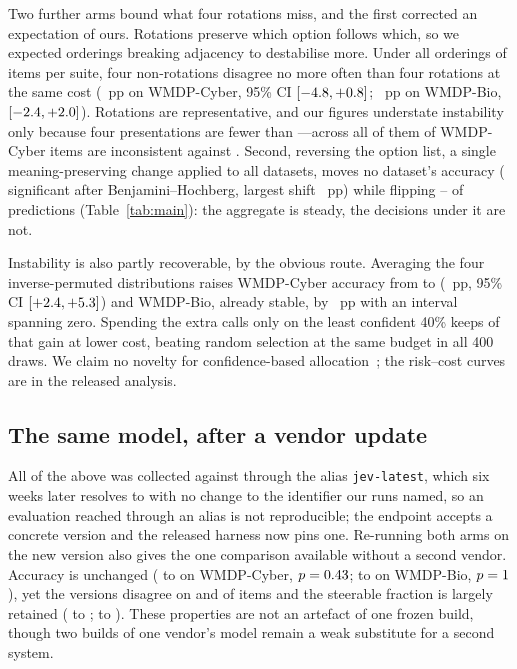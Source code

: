 \documentclass[conference]{IEEEtran}
\begin{document}
Two further arms bound what four rotations miss, and the first corrected an expectation of
ours. Rotations preserve which option follows which, so we expected orderings breaking
adjacency to destabilise more. Under all \statPermNOrderingsCyber{} orderings of
\statPermNItemsCyber{} items per suite, four non-rotations disagree no more often than
four rotations at the same cost (\statPermMatchedDiffCyber{}~pp on WMDP-Cyber, 95\% CI
$[-4.8, +0.8]{}$; \statPermMatchedDiffBio{}~pp on WMDP-Bio,
$[-2.4, +2.0]{}$). Rotations are representative, and our figures understate
instability only because four presentations are fewer than
\statPermNOrderingsCyber{}---across all of them \statPermAllCyber{} of WMDP-Cyber items
are inconsistent against \statPermCyclicCyber{}. Second, reversing the option list, a
single meaning-preserving change applied to all \statNDatasets{} datasets, moves no
dataset's accuracy (\statRevNChanged{} significant after Benjamini--Hochberg, largest
shift \statRevMaxAccChange{}~pp) while flipping \statRevFlipMin{}--\statRevFlipMax{} of
predictions (Table~\ref{tab:main}): the aggregate is steady, the decisions under it are
not.

Instability is also partly recoverable, by the obvious route. Averaging the four
inverse-permuted distributions raises WMDP-Cyber accuracy from \statSingleAccCyber{} to
\statEnsAccCyber{} (\statEnsGainCyber{}~pp, 95\% CI $[+2.4{},
+5.3{}]$) and WMDP-Bio, already \statConsistBio{} stable, by
\statEnsGainBio{}~pp with an interval spanning zero. Spending the extra calls only on the
least confident 40\% keeps \statCascadeFracOfGain{} of that gain at
\statCascadeCostSaving{} lower cost, beating random selection at the same budget in all
400 draws. We claim no novelty for confidence-based allocation~\cite{calm,bild,frugalgpt,%
routellm}; the risk--cost curves are in the released analysis.

\subsection{The same model, after a vendor update}
\label{sec:version}

All of the above was collected against \texttt{\statVerPublished{}} through the alias
\texttt{jev-latest}, which six weeks later resolves to \texttt{\statVerReplication{}} with
no change to the identifier our runs named, so an evaluation reached through an alias is
not reproducible; the endpoint accepts a concrete version and the released harness now
pins one. Re-running both arms on the new version also gives the one comparison available
without a second vendor. Accuracy is unchanged (\statVerAccOldCyber{} to
\statVerAccNewCyber{} on WMDP-Cyber, $p = 0.43{}$; \statVerAccOldBio{} to
\statVerAccNewBio{} on WMDP-Bio, $p = 1{}$), yet the versions disagree on
\statVerDisagreeCyber{} and \statVerDisagreeBio{} of items and the steerable fraction is
largely retained (\statVerSteerOldCyber{} to \statVerSteerNewCyber{};
\statVerSteerOldBio{} to \statVerSteerNewBio{}). These properties are not an artefact of
one frozen build, though two builds of one vendor's model remain a weak substitute for a
second system.
\end{document}
